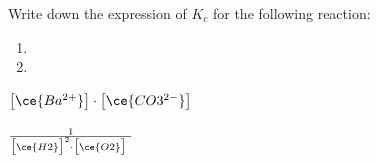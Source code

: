 \documentclass[main.tex]{subfiles}
\begin{document}
\begin{multicols*}{2}
\begin{question}[ID=\the\value{numA}]
Write down the expression of $K_c$ for the following reaction:
 \begin{enumerate}[label=(\alph*)]	
\item {} %
\item {} %
 \end{enumerate}
\end{question}
\begin{solution}
\begin{inparaenum}[(a)]
\item   $\big[\ce{Ba^{2+}}\big] \cdot \big[\ce{CO3^{2-}} \big]\  $
\item  $\frac{  1  } { \big[\ce{H2} \big]^2 \cdot \big[\ce{O2} \big]\  } $
 \end{inparaenum}
\hspace{0.1cm}\end{solution}%




\end{multicols*}
\end{document}
